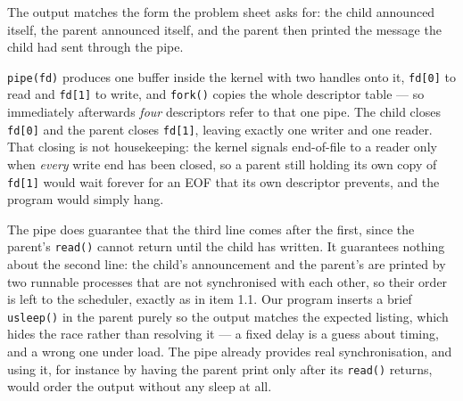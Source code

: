 
The output matches the form the problem sheet asks for: the child announced
itself, the parent announced itself, and the parent then printed the message the
child had sent through the pipe.

\texttt{pipe(fd)} produces one buffer inside the kernel with two handles onto it,
\texttt{fd[0]} to read and \texttt{fd[1]} to write, and \texttt{fork()} copies the
whole descriptor table --- so immediately afterwards \emph{four} descriptors refer
to that one pipe. The child closes \texttt{fd[0]} and the parent closes
\texttt{fd[1]}, leaving exactly one writer and one reader. That closing is not
housekeeping: the kernel signals end-of-file to a reader only when \emph{every}
write end has been closed, so a parent still holding its own copy of
\texttt{fd[1]} would wait forever for an EOF that its own descriptor prevents,
and the program would simply hang.

The pipe does guarantee that the third line comes after the first, since the
parent's \texttt{read()} cannot return until the child has written. It guarantees
nothing about the second line: the child's announcement and the parent's are
printed by two runnable processes that are not synchronised with each other, so
their order is left to the scheduler, exactly as in item 1.1. Our program inserts
a brief \texttt{usleep()} in the parent purely so the output matches the expected
listing, which hides the race rather than resolving it --- a fixed delay is a
guess about timing, and a wrong one under load. The pipe already provides real
synchronisation, and using it, for instance by having the parent print only after
its \texttt{read()} returns, would order the output without any sleep at all.
